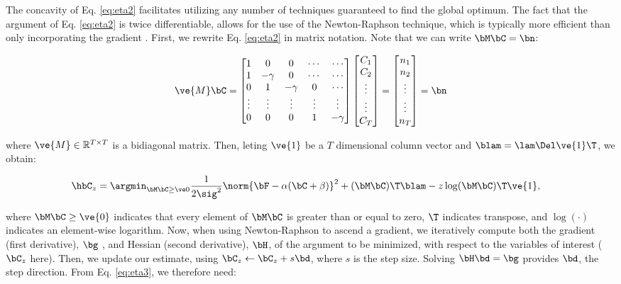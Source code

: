 \noindent The concavity of Eq. \eqref{eq:eta2} facilitates utilizing any number of techniques guaranteed to find the global optimum.  The fact that the argument of Eq. \eqref{eq:eta2} is twice differentiable, allows for the use of the Newton-Raphson technique, which is typically more efficient than only incorporating the gradient \cite{CONV04}. First, we rewrite Eq. \eqref{eq:eta2} in matrix notation.  Note that we can write $\bM \bC = \bn$:

\begin{align} \label{eq:M}
\ve{M} \bC = %
\begin{bmatrix}
1 & 0  & 0 & \cdots & \cdots \\
1 & -\gamma & 0 & \cdots & \cdots \\
0 & 1 & -\gamma & 0 & \cdots  \\
\vdots & \vdots & \vdots & \vdots & \vdots  \\
0 & 0 & 0 & 1 & -\gamma
\end{bmatrix}
\begin{bmatrix}
C_1 \\ C_2 \\ \vdots \\ \vdots \\ C_T  
\end{bmatrix}
= 
\begin{bmatrix}
n_1 \\ n_2 \\ \vdots \\ \vdots \\ n_T
\end{bmatrix}
= \bn
\end{align}

\noindent where $\ve{M} \in \mathbb{R}^{T \times T}$ is a bidiagonal matrix.  Then, leting $\ve{1}$ be a $T$ dimensional column vector and $\blam=\lam \Del \ve{1}\T$, we obtain: 

\begin{align} 
\hbC_{\zzz} 
&= \az  \frac{1}{2 \sig^2} \norm{\bF - \alpha (\bC +\beta)}^2 + (\bM \bC )\T \blam  - \zzz \log(\bM \bC)\T\ve{1},  \label{eq:eta3}
\end{align}

\noindent where $\bM \bC \geq \ve{0}$ indicates that every element of $\bM \bC$ is greater than or equal to zero, $\T$ indicates transpose, and $\log(\cdot)$ indicates an element-wise logarithm. Now, when using Newton-Raphson to ascend a gradient, we iteratively compute both the gradient (first derivative), $\bg$ , and Hessian (second derivative), $\bH$, of the argument to be minimized, with respect to the variables of interest ($\bC_z$ here).  Then, we update our estimate, using $\bC_z \leftarrow \bC_z + s \bd$, where $s$ is the step size. Solving $\bH \bd = \bg$ provides $\bd$, the step direction.  From Eq. \eqref{eq:eta3}, we therefore need:


